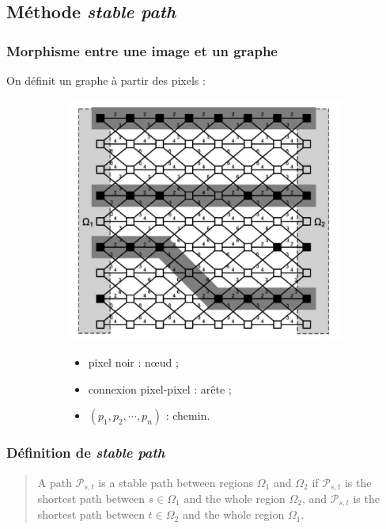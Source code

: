\documentclass{beamer}
\begin{document}
\subsection{Méthode \textit{stable path}}
\begin{frame}
    \frametitle{Morphisme entre une image et un graphe}
    On définit un graphe à partir des pixels :
    \begin{figure}
    \begin{subfigure}{0.4\linewidth}
        \includegraphics[height=0.5\textheight]{img/pixel-graph.png}
    \end{subfigure}
    \hspace*{\fill}
    \begin{subfigure}{0.4\linewidth}
        \begin{itemize}
            \item pixel noir : nœud ;
            \item connexion pixel-pixel : arête ;
            \item $(p_1, p_2, \cdots, p_n)$ : chemin.
        \end{itemize}
    \end{subfigure}
    \end{figure}
\end{frame}

\begin{frame}
    \frametitle{Définition de \textit{stable path}}
    \begin{quotation}
        A path $\mathcal{P}_{s, t}$ is a stable path between regions $\Omega_1$ and $\Omega_2$ if $\mathcal{P}_{s, t}$ is the shortest path between $s \in \Omega_1$ and the whole region $\Omega_2$, and $\mathcal{P}_{s, t}$ is the shortest path between $t \in \Omega_2$ and the whole region $\Omega_1$.
    \end{quotation}    
\end{frame}
\end{document}

